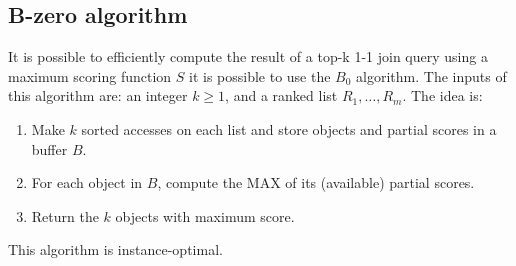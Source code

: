 \documentclass[12pt, a4paper]{report}
\newtheorem[style=M,bodystyle=\normalfont]{theorem}{Theorem}
\newtheorem[style=M,bodystyle=\normalfont]{corollary}{Corollary}
\newtheorem[style=M,bodystyle=\normalfont]{lemma}{Lemma}
\newtheorem[style=M,bodystyle=\normalfont]{definition}{Definition}
\begin{document}
    \subsection{B-zero algorithm}
    It is possible to efficiently compute the result of a top-k 1-1 join query using a maximum scoring function $S$ it is possible to use the $B_0$ algorithm. The inputs
    of this algorithm are: an integer $k \geq 1$, and a ranked list $R_1,\dots,R_m$. The idea is: 
    \begin{enumerate}
        \item Make $k$ sorted accesses on each list and store objects and partial scores in a buffer $B$. 
        \item For each object in $B$, compute the MAX of its (available) partial scores.
        \item Return the $k$ objects with maximum score.
    \end{enumerate}
    This algorithm is instance-optimal. 
\end{document}

